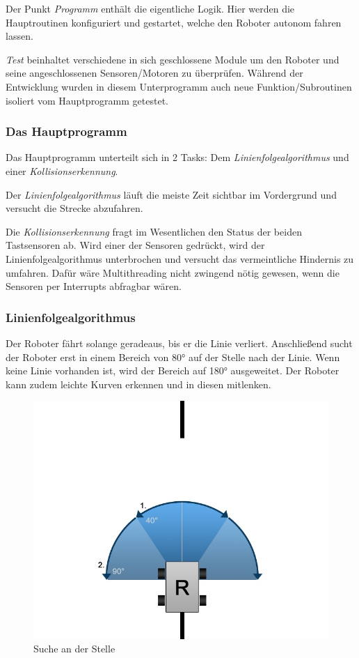 \documentclass[a4paper]{article}
\begin{document}
Der Punkt \emph{Programm} enthält die eigentliche Logik. Hier
werden die Hauptroutinen konfiguriert und gestartet, welche den
Roboter autonom fahren lassen.

\emph{Test} beinhaltet verschiedene in sich geschlossene Module um
den Roboter und seine angeschlossenen Sensoren/Motoren zu überprüfen.
Während der Entwicklung wurden in diesem Unterprogramm auch neue
Funktion/Subroutinen isoliert vom Hauptprogramm getestet.

\subsubsection{Das Hauptprogramm}
Das Hauptprogramm unterteilt sich in 2 Tasks: Dem
\emph{Linienfolgealgorithmus} und einer \emph{Kollisionserkennung}.

Der \emph{Linienfolgealgorithmus} läuft die meiste Zeit sichtbar im
Vordergrund und versucht die Strecke abzufahren.

Die \emph{Kollisionserkennung} fragt im Wesentlichen den Status der
beiden Tastsensoren ab. Wird einer der Sensoren gedrückt, wird der
Linienfolgealgorithmus unterbrochen und versucht das vermeintliche
Hindernis zu umfahren. Dafür wäre Multithreading nicht zwingend nötig
gewesen, wenn die Sensoren per Interrupts abfragbar wären.

\subsubsection{Linienfolgealgorithmus}
Der Roboter fährt solange geradeaus, bis er die Linie verliert.
Anschließend sucht der Roboter erst in einem Bereich von 80° auf der
Stelle nach der Linie. Wenn keine Linie vorhanden ist, wird der
Bereich auf 180° ausgeweitet. Der Roboter kann zudem leichte Kurven
erkennen und in diesen mitlenken.

\begin{figure}[ht]
  \centering
  \caption{Suche an der Stelle}
  \includegraphics[scale=0.4]{suchnanderstelle.jpg}
\end{figure}
\end{document}
